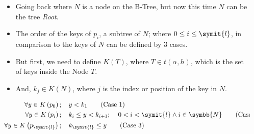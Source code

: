 \begin{frame}
    \begin{columns}
        \begin{column}{\textlecolumn}
            \begin{block}{}
                \begin{itemize}
                    \item Going back where \(N\) is a node on the B-Tree, but now this time \(N\) can be the tree \emph{Root}.
                    \item The order of the keys of \(p_i\), a subtree of \(N\); where \(0 \leq i \leq \symit{l}\), in comparison to the keys of \(N\) can be defined by 3 cases.
                    \item But first, we need to define \(K\left(T\right)\), where \(T \in t\left(\alpha, h\right)\), which is the set of keys inside the Node \(T\).
                    \item And, \(k_j \in K\left(N\right)\), where \(j\) is the index or position of the key in \(N\).
                \end{itemize}
                \vspace{0.5cm}
                \begin{align}
                    \forall y \in K\left(p_0\right);\mspace{20mu}& y < k_1 \tag{Case 1}\label{case1-subt-t-comp} \\
                    \forall y \in K\left(p_{i}\right);\mspace{20mu}& k_i \leq y < k_{i + 1};\mspace{20mu} 0 < i < \symit{l} \wedge i \in \symbb{N} \tag{Case 2}\label{case2-subt-t-comp} \\
                    \forall y \in K\left(p_{\symit{l}}\right);\mspace{20mu}& k_{\symit{l}} \leq y \tag{Case 3}\label{case3-subt-t-comp}
                \end{align}
            \end{block}
        \end{column}
        \begin{column}{\textricolumn}
            \begin{block}{}
            \end{block}
        \end{column}
    \end{columns}
    
    \framebreak


\end{frame}
